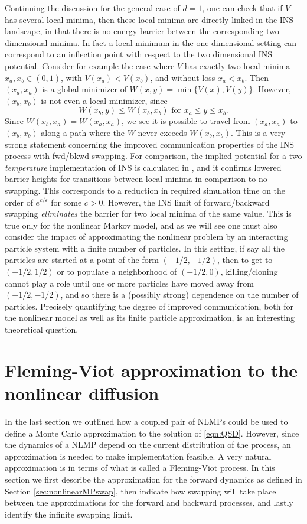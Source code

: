 \documentclass[english,11pt]{article}%
\numberwithin{equation}{section}
\numberwithin{example}{section}
\numberwithin{theorem}{section}
\begin{document}
Continuing the discussion for the general case of $d=1$, one can check that if $V$ has
several local minima, then these local minima are directly linked in the INS
landscape, in that there is no energy barrier between the corresponding
two-dimensional minima. In fact a local minimum in the one dimensional setting
can correspond to an inflection point with respect to the two dimensional INS
potential. Consider for example the case where $V$ has exactly two local
minima $x_{a},x_{b}\in(0,1)$, with $V(x_{a})<V(x_{b})$, and without loss
$x_{a}<x_{b}$. Then $(x_{a},x_{a})$ is a global minimizer
of $W(x,y)=\min\{V(x),V(y)\}$. However, $(x_{b},x_{b})$ is not even a local
minimizer, since
\[
W(x_{b},y)\leq W(x_{b},x_b)\text{ for }x_{a}\leq y\leq x_{b}.
\]
Since $W(x_{b},x_{a})=W(x_{a},x_{a})$, we see it is possible to travel from
$(x_{a},x_{a})$ to $(x_{b},x_{b})$ along a path where the $W$ never exceeds
$W(x_{b},x_{b})$. 
This is a very strong statement concerning the improved communication properties of the INS process with fwd/bkwd swapping.
For comparison, the implied
potential for a two \textit{temperature} implementation of INS is calculated
in \cite{pladoldupliuwangub}, and it confirms lowered barrier heights for transitions between local
minima in comparison to no swapping. This corresponds to a reduction in
required simulation time on the order of $e^{c/\varepsilon}$ for some $c>0$.
However, the INS limit of forward/backward swapping \textit{eliminates} the
barrier for two local minima of the same value. 
This is true only for the nonlinear Markov model,
and as we will see one must also consider the impact of approximating the nonlinear problem by an interacting particle system with a finite number of particles.
In this setting,
if say all the particles are started at a point of the form $(-1/2,-1/2)$,
then to get to $(-1/2,1/2)$ or to populate a neighborhood of $(-1/2,0)$,
killing/cloning cannot play a role until one or more particles have moved away from $(-1/2,-1/2)$,
and so there is a (possibly strong) dependence on the number of particles.
Precisely quantifying the degree of improved communication,
both for the nonlinear model as well as its finite particle approximation,
is an interesting
theoretical question.

\section{Fleming-Viot approximation to the nonlinear diffusion}
\label{sec:fleming-viot}

In the last section we outlined how a coupled pair of NLMPs could be used to
define a Monte Carlo approximation to the solution of \eqref{eqn:QSD}.
However, since the dynamics of a NLMP depend on the current distribution
of the process, an approximation is needed to make implementation feasible. A
very natural approximation is in terms of what is called a Fleming-Viot
process. In this section we first describe the approximation for the forward
dynamics as defined in Section \ref{sec:nonlinearMPswap}, then indicate how
swapping will take place between the approximations for the forward and
backward processes, and lastly identify the infinite swapping limit.
\end{document}
